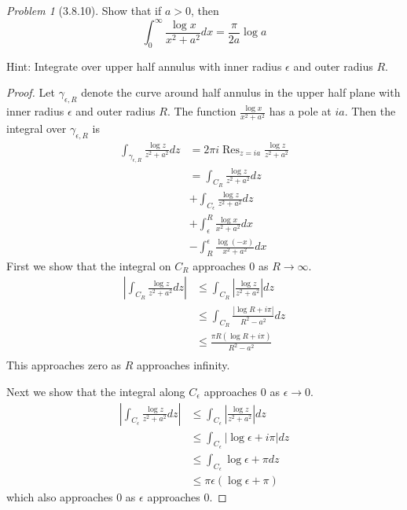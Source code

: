 \documentclass[10pt]{article}
\newcommand{\sk}{\vskip 10mm}
\DeclareMathOperator{\Res}{Res}
\theoremstyle{remark}
\newtheorem{problem}{Problem}
\theoremstyle{remark}
\begin{document}
\sk

\begin{problem}[3.8.10]
  Show that if $a>0$, then
  \[
    \int_0^\infty\frac{\log x}{x^2+a^2}dx=\frac{\pi}{2a}\log a
  \]

  Hint: Integrate over upper half annulus with inner radius $\epsilon$ and outer
  radius $R$.
\end{problem}

\begin{proof}
  Let $\gamma_{\epsilon,R}$ denote the curve around half annulus in the upper half plane with
  inner radius $\epsilon$ and outer radius $R$. The function $\frac{\log x}{x^2+a^2}$ has
  a pole at $ia$. Then the integral over $\gamma_{\epsilon,R}$ is
  \begin{align*}
    \int_{\gamma_{\epsilon,R}}\frac{\log z}{z^2+a^2} dz&= 2\pi i\Res_{z=ia}\frac{\log z}{z^2+a^2}\\
                                                    &= \int_{C_R}\frac{\log z}{z^2+a^2}dz \\
                                                    &+ \int_{C_\epsilon}\frac{\log z}{z^2+a^2}dz \\
                                                    &+ \int_\epsilon^R \frac{\log x}{x^2+a^2}dx\\
                                                    &-\int_{R}^{\epsilon}\frac{\log \left(-x\right)}{x^2+a^2}dx
  \end{align*}
  First we show that the integral on $C_R$ approaches $0$ as $R\rightarrow\infty$.
  \begin{align*}
    \left|\int_{C_R}\frac{\log z}{z^2+a^2}dz\right| &\leq \int_{C_R}\left|\frac{\log z}{z^2+a^2}\right|dz\\
                                    &\leq \int_{C_R}\frac{\left|\log R+i\pi\right|}{R^2-a^2}dz\\
                                    &\leq \frac{\pi R\left(\log R+i\pi\right)}{R^2-a^2}\\
  \end{align*}
  This approaches zero as $R$ approaches infinity.

  Next we show that the integral along $C_\epsilon$ approaches $0$ as $\epsilon\rightarrow 0$.
  \begin{align*}
    \left|\int_{C_\epsilon}\frac{\log z}{z^2+a^2}dz\right| & \leq\int_{C_\epsilon}\left|\frac{\log z}{z^2+a^2}\right|dz \\
                                   &\leq\int_{C_\epsilon}\left|\log \epsilon + i\pi \right|dz\\
                                   &\leq\int_{C_\epsilon}\log \epsilon + \pi dz\\
                                   &\leq\pi\epsilon\left(\log \epsilon+\pi\right)
  \end{align*}
  which also approaches $0$ as $\epsilon$ approaches $0$.
  

\end{proof}
\end{document}

